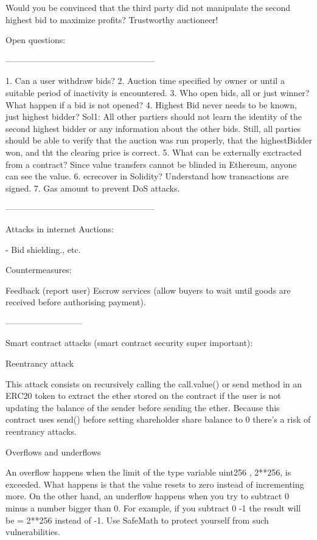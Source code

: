 Would you be convinced that the third party did not manipulate the second highest bid to maximize profits? Trustworthy auctioneer!


Open questions:

-----------------------------------------------------

1. Can a user withdraw bids?
2. Auction time specified by owner or until a suitable period of inactivity is encountered.
3. Who open bids, all or just winner? What happen if a bid is not opened?
4. Highest Bid never needs to be known, just highest bidder? Sol1: All other partiers should not learn the identity of the second highest bidder or any information about the other bids. Still, all parties should be able to verify that the auction was run properly, that the highestBidder won, and tht the clearing price is correct.
5. What can be externally exctracted from a contract? Since value transfers cannot be blinded in Ethereum, anyone can see the value.
6. ecrecover in Solidity? Understand how transactions are signed.
7. Gas amount to prevent DoS attacks.

-----------------------------------------------------

Attacks in internet Auctions:

- Bid shielding., etc.

Countermeasures:

Feedback (report user)
Escrow services (allow buyers to wait until goods are received before authorising payment).

---------------------------

Smart contract attacks (smart contract security super important):

Reentrancy attack

This attack consists on recursively calling the call.value() or send method in an ERC20 token to extract the ether stored on the contract if the user is not updating the balance of the sender before sending the ether.
Because this contract uses send() before setting shareholder share balance to 0 there’s a risk of reentrancy attacks.

Overflows and underflows

An overflow happens when the limit of the type variable uint256 , 2**256, is exceeded. What happens is that the value resets to zero instead of incrementing more. On the other hand, an underflow happens when you try to subtract 0 minus a number bigger than 0. For example, if you subtract 0 -1 the result will be = 2**256 instead of -1. Use SafeMath to protect yourself from such vulnerabilities.


